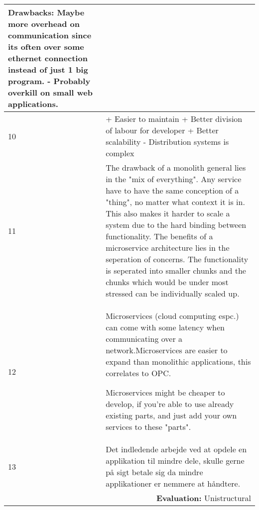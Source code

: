 \begin{longtable}{|p{0.3cm}|p{14.7cm}|}
\noindent Drawbacks: Maybe more overhead on communication since its often over some ethernet connection instead of just 1 big program. - Probably overkill on small web applications. \\ \hline

10 & + Easier to maintain + Better division of labour for developer + Better scalability - Distribution systems is complex \\ \hline

11 & The drawback of a monolith general lies in the "mix of everything". Any service have to have the same conception of a "thing", no matter what context it is in. This also makes it harder to scale a system due to the hard binding between functionality. The benefits of a microservice architecture lies in the seperation of concerns. The functionality is seperated into smaller chunks and the chunks which would be under most stressed can be individually scaled up. \\ \hline

12 & Microservices (cloud computing espc.) can come with some latency when communicating over a network.Microservices are easier to expand than monolithic applications, this correlates to OPC.

\noindent Microservices might be cheaper to develop, if you're able to use already existing parts, and just add your own services to these "parts". \\ \hline

13 & Det indledende arbejde ved at opdele en applikation til mindre dele, skulle gerne på sigt betale sig da mindre applikationer er nemmere at håndtere. \\ \hline

\multicolumn{2}{r}{\textbf{Evaluation:} Unistructural} \\ 
\end{longtable}
\normalsize

















